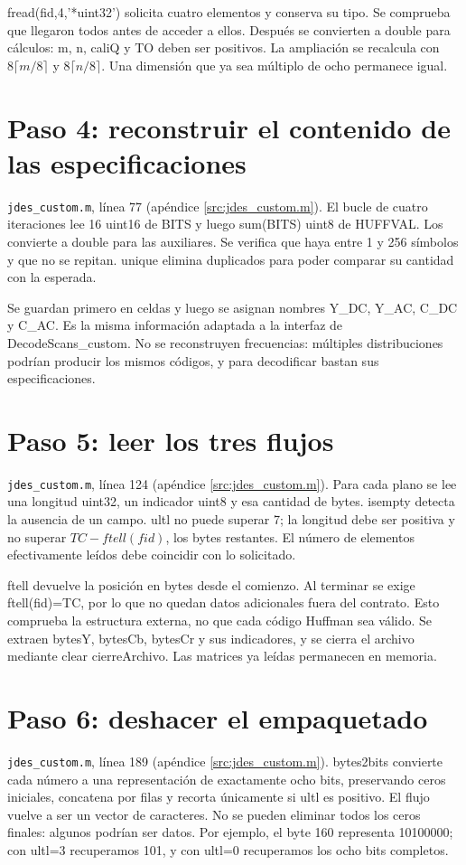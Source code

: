 \documentclass[11pt,a4paper,oneside]{report}
\begin{document}
fread(fid,4,'*uint32') solicita cuatro elementos y conserva su tipo.
Se comprueba que llegaron todos antes de acceder a ellos. Después se convierten
a double para cálculos: m, n, caliQ y TO deben ser positivos.
La ampliación se recalcula con $8\lceil m/8\rceil$ y $8\lceil n/8\rceil$.
Una dimensión que ya sea múltiplo de ocho permanece igual.


\section{Paso 4: reconstruir el contenido de las especificaciones}
\texttt{jdes\_custom.m}, línea 77 (apéndice \ref{src:jdes_custom.m}).
El bucle de cuatro iteraciones lee 16 uint16 de BITS y luego sum(BITS) uint8
de HUFFVAL. Los convierte a double para las auxiliares. Se verifica que haya
entre 1 y 256 símbolos y que no se repitan. unique elimina duplicados para
poder comparar su cantidad con la esperada.

Se guardan primero en celdas y luego se asignan nombres Y\_DC, Y\_AC, C\_DC
y C\_AC. Es la misma información adaptada a la interfaz de DecodeScans\_custom.
No se reconstruyen frecuencias: múltiples distribuciones podrían producir
los mismos códigos, y para decodificar bastan sus especificaciones.


\section{Paso 5: leer los tres flujos}
\texttt{jdes\_custom.m}, línea 124 (apéndice \ref{src:jdes_custom.m}).
Para cada plano se lee una longitud uint32, un indicador uint8 y esa cantidad
de bytes. isempty detecta la ausencia de un campo. ultl no puede superar 7;
la longitud debe ser positiva y no superar $TC-ftell(fid)$, los bytes restantes.
El número de elementos efectivamente leídos debe coincidir con lo solicitado.

ftell devuelve la posición en bytes desde el comienzo. Al terminar se exige
ftell(fid)=TC, por lo que no quedan datos adicionales fuera del contrato.
Esto comprueba la estructura externa, no que cada código Huffman sea válido.
Se extraen bytesY, bytesCb, bytesCr y sus indicadores, y se cierra el archivo
mediante clear cierreArchivo. Las matrices ya leídas permanecen en memoria.


\section{Paso 6: deshacer el empaquetado}
\texttt{jdes\_custom.m}, línea 189 (apéndice \ref{src:jdes_custom.m}).
bytes2bits convierte cada número a una representación de exactamente ocho
bits, preservando ceros iniciales, concatena por filas y recorta únicamente
si ultl es positivo. El flujo vuelve a ser un vector de caracteres.
No se pueden eliminar todos los ceros finales: algunos podrían ser datos.
Por ejemplo, el byte 160 representa 10100000; con ultl=3 recuperamos 101,
y con ultl=0 recuperamos los ocho bits completos.
\end{document}
